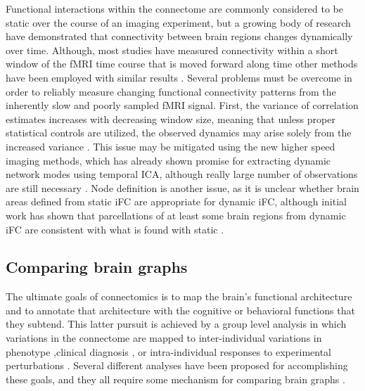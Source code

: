 Functional interactions within the connectome are commonly considered to be static over the course of an imaging experiment, but a growing body of research have demonstrated that connectivity between brain regions changes dynamically over time\cite{Hutchison2013}. Although, most studies have measured connectivity within a short window of the fMRI time course that is moved forward along time \cite{Keilholz2013,Chang2010,Yang2014,Allen2014} other methods have been employed with similar results  \cite{Majeed2011,Smith2012}. Several problems must be overcome in order to reliably measure changing functional connectivity patterns from the inherently slow and poorly sampled fMRI signal. First, the variance of correlation estimates increases with decreasing window size, meaning that unless proper statistical controls are utilized, the observed dynamics may arise solely from the increased variance \cite{Handwerker2012}. This issue may be mitigated using the new higher speed imaging methods, which has already shown promise for extracting dynamic network modes using temporal ICA, although really large number of observations are still necessary \cite{Smith2012}. Node definition is another issue, as it is unclear whether brain areas defined from static iFC are appropriate for dynamic iFC, although initial work has shown that parcellations of at least some brain regions from dynamic iFC are consistent with what is found with static \cite{Yang2014}.

\subsection{Comparing brain graphs} 

The ultimate goals of connectomics is to map the brain's functional architecture and to annotate that architecture with the cognitive or behavioral functions that they subtend. This latter pursuit is achieved by a group level analysis in which variations in the connectome are mapped to inter-individual variations in phenotype  \cite{Kelly2012},clinical diagnosis \cite{Castellanos2013}, or intra-individual responses to experimental perturbations \cite{Shirer2012}. Several different analyses have been proposed for accomplishing these goals, and they all require some mechanism for comparing brain graphs \cite{Varoquaux2013}. 
 
